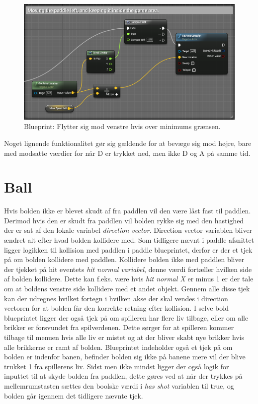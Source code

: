 \begin{figure}
	\begin{center}
		\caption{Blueprint: Flytter sig mod venstre hvis over minimums grænsen.}
		\label{dia:paddlemoveleft}
		\includegraphics[width=0.98\linewidth]{pictures/blueprints/paddle-move-left}
		\end{center}
\end{figure}

Noget lignende funktionalitet gør sig gældende for at bevæge sig mod højre, bare med modsatte værdier for når D er trykket ned, men ikke D og A på samme tid.

\section{Ball}
Hvis bolden ikke er blevet skudt af fra paddlen vil den være låst fast til paddlen. Derimod hvis den er skudt fra paddlen vil bolden rykke sig med den hastighed der er sat af den lokale variabel \textit{direction vector}. Direction vector variablen bliver ændret alt efter hvad bolden kollidere med. Som tidligere nævnt i paddle afsnittet ligger logikken til kollision med paddlen i paddle blueprintet, derfor er der et tjek på om bolden kollidere med paddlen. Kollidere bolden ikke med paddlen bliver der tjekket på hit eventets \textit{hit normal variabel}, denne værdi fortæller hvilken side af bolden kollidere. Dette kan f.eks. være hvis \textit{hit normal X} er minus 1 er der tale om at boldens venstre side kollidere med et andet objekt. Gennem alle disse tjek kan der udregnes hvilket fortegn i hvilken akse der skal vendes i direction vectoren for at bolden får den korrekte retning efter kollision. I selve bold blueprintet ligger der også tjek på om spilleren har flere liv tilbage, eller om alle brikker er forsvundet fra spilverdenen. Dette sørger for at spilleren kommer tilbage til menuen hvis alle liv er mistet og at der bliver skabt nye brikker hvis alle brikkerne er ramt af bolden. Blueprintet indeholder også et tjek på om bolden er indenfor banen, befinder bolden sig ikke på banene mere vil der blive trukket 1 fra spillerens liv. Sidst men ikke mindst ligger der også logik for inputtet til at skyde bolden fra paddlen, dette gøres ved at når der trykkes på mellemrumstasten sættes den boolske værdi i \textit{has shot} variablen til true, og bolden går igennem det tidligere nævnte tjek.  

